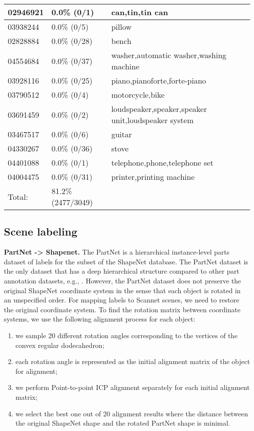 \begin{table}[]
\begin{tabular}{l|l|l}
02946921 & 0.0\% (0/1) & can,tin,tin can \\ \hline
03938244 & 0.0\% (0/5) & pillow \\ \hline
02828884 & 0.0\% (0/28) & bench \\ \hline
04554684 & 0.0\% (0/37) & washer,automatic washer,washing machine \\ \hline
03928116 & 0.0\% (0/25) & piano,pianoforte,forte-piano \\ \hline
03790512 & 0.0\% (0/4) & motorcycle,bike \\ \hline
03691459 & 0.0\% (0/2) & loudspeaker,speaker,speaker unit,loudspeaker system \\ \hline
03467517 & 0.0\% (0/6) & guitar \\ \hline
04330267 & 0.0\% (0/36) & stove \\ \hline
04401088 & 0.0\% (0/1) & telephone,phone,telephone set \\ \hline
04004475 & 0.0\% (0/31) & printer,printing machine \\ \hline
Total:    & 81.2\% (2477/3049) &         \\
\end{tabular}
\end{table}




\subsection{Scene labeling}

\textbf{PartNet -> Shapenet.} The PartNet \cite{mo2019partnet} is a hierarchical instance-level parts dataset of labels for the subset of the ShapeNet database. The PartNet dataset is the only dataset that has a deep hierarchical structure compared to other part annotation datasets, e.g.,  \cite{Yi16}. However, the PartNet dataset does not preserve the original ShapeNet coordinate system in the sense that each object is rotated in an unspecified order. For mapping labels to Scannet scenes, we need to restore the original coordinate system. To find the rotation matrix between coordinate systems, we use the following alignment process for each object: \begin{enumerate}
    \item we sample 20 different rotation angles corresponding to the vertices of the convex regular dodecahedron;
    \item each rotation angle is represented as the initial alignment matrix of the object for alignment;
    \item we perform Point-to-point ICP alignment separately for each initial alignment matrix;
    \item we select the best one out of 20 alignment results where the distance between the original ShapeNet shape and the rotated PartNet shape is minimal.
\end{enumerate}

